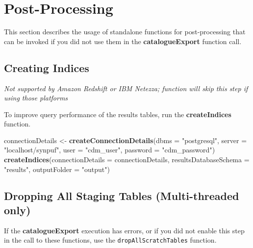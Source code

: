 \documentclass[
]{article}
\newenvironment{Shaded}{\begin{snugshade}}{\end{snugshade}}
\newcommand{\DataTypeTok}[1]{\textcolor[rgb]{0.13,0.29,0.53}{#1}}
\newcommand{\KeywordTok}[1]{\textcolor[rgb]{0.13,0.29,0.53}{\textbf{#1}}}
\newcommand{\NormalTok}[1]{#1}
\newcommand{\StringTok}[1]{\textcolor[rgb]{0.31,0.60,0.02}{#1}}
\begin{document}
\hypertarget{post-processing}{%
\section{Post-Processing}\label{post-processing}}

This section describes the usage of standalone functions for
post-processing that can be invoked if you did not use them in the
\textbf{catalogueExport} function call.

\hypertarget{creating-indices}{%
\subsection{Creating Indices}\label{creating-indices}}

\emph{Not supported by Amazon Redshift or IBM Netezza; function will
skip this step if using those platforms}

To improve query performance of the results tables, run the
\textbf{createIndices} function.

\begin{Shaded}
\begin{Highlighting}[]
\NormalTok{connectionDetails <-}\StringTok{ }\KeywordTok{createConnectionDetails}\NormalTok{(}\DataTypeTok{dbms =} \StringTok{"postgresql"}\NormalTok{, }
                                             \DataTypeTok{server =} \StringTok{"localhost/synpuf"}\NormalTok{, }
                                             \DataTypeTok{user =} \StringTok{"cdm_user"}\NormalTok{, }
                                             \DataTypeTok{password =} \StringTok{"cdm_password"}\NormalTok{)}
\KeywordTok{createIndices}\NormalTok{(}\DataTypeTok{connectionDetails =}\NormalTok{ connectionDetails, }
              \DataTypeTok{resultsDatabaseSchema =} \StringTok{"results"}\NormalTok{, }
              \DataTypeTok{outputFolder =} \StringTok{"output"}\NormalTok{)}
\end{Highlighting}
\end{Shaded}

\hypertarget{dropping-all-staging-tables-multi-threaded-only}{%
\subsection{Dropping All Staging Tables (Multi-threaded
only)}\label{dropping-all-staging-tables-multi-threaded-only}}

If the \textbf{catalogueExport} execution has errors, or if you did not
enable this step in the call to these functions, use the
\texttt{dropAllScratchTables} function.
\end{document}
